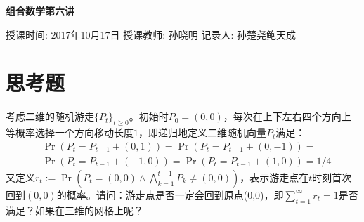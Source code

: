 ﻿\documentclass[11pt]{article}
\begin{document}
    \pagestyle{fancy}
    \chead{}

    \begin{center}
        {\LARGE \bf 组合数学第六讲}\\
    \end{center}
        \begin{kaishu}
            授课时间: 2017年10月17日\quad
            授课教师: 孙晓明
            \hfill 记录人: 孙楚尧\quad 鲍天成
        \end{kaishu}


    \section{思考题}
    考虑二维的随机游走$\{P_t\}_{t\geq 0}$。初始时$P_0=(0, 0)$，每次在上下左右四个方向上等概率选择一个方向移动长度$1$，即递归地定义二维随机向量$P_t$满足：
    \begin{align*}
        &\Pr(P_t=P_{t-1}+(0,1)) = \Pr(P_t=P_{t-1}+(0,-1)) = \\
        &\Pr(P_t=P_{t-1}+(-1,0)) = \Pr(P_t=P_{t-1}+(1,0)) = 1/4
    \end{align*}
    又定义$r_t := \Pr(P_t=(0,0)\land \bigwedge_{k=1}^{t-1} P_{k}\not=(0,0))$，表示游走点在$t$时刻首次回到$(0,0)$的概率。请问：游走点是否一定会回到原点(0,0)，即$\sum_{t=1}^\infty r_t=1$是否满足？如果在三维的网格上呢？
\end{document}
